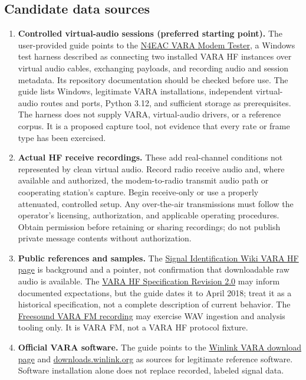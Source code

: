 \documentclass[11pt,a4paper]{article}
\begin{document}
\subsection{Candidate data sources}
\begin{enumerate}[leftmargin=*]
  \item \textbf{Controlled virtual-audio sessions (preferred starting point).}
        The user-provided guide points to the
        \href{https://github.com/N4EAC/VARA-Modem-Tester}{N4EAC VARA Modem
        Tester}, a Windows test harness described as connecting two installed
        VARA HF instances over virtual audio cables, exchanging payloads, and
        recording audio and session metadata. Its repository documentation
        should be checked before use. The guide lists Windows, legitimate
        VARA installations, independent virtual-audio routes and ports,
        Python 3.12, and sufficient storage as prerequisites. The harness does
        not supply VARA, virtual-audio drivers, or a reference corpus. It is a
        proposed capture tool, not evidence that every rate or frame type has
        been exercised.
  \item \textbf{Actual HF receive recordings.} These add real-channel
        conditions not represented by clean virtual audio. Record radio
        receive audio and, where available and authorized, the modem-to-radio
        transmit audio path or cooperating station's capture. Begin
        receive-only or use a properly attenuated, controlled setup. Any
        over-the-air transmissions must follow the operator's licensing,
        authorization, and applicable operating procedures. Obtain permission
        before retaining or sharing recordings; do not publish private message
        contents without authorization.
  \item \textbf{Public references and samples.} The
        \href{https://www.sigidwiki.com/wiki/VARA_HF}{Signal Identification
        Wiki VARA HF page} is background and a pointer, not confirmation that
        downloadable raw audio is available. The
        \href{https://sbcara.org/wp-content/uploads/2025/08/VARA-Specification.pdf}
        {VARA HF Specification Revision 2.0} may inform documented
        expectations, but the guide dates it to April 2018; treat it as a
        historical specification, not a complete description of current
        behavior. The
        \href{https://freesound.org/people/gregoryhancock/sounds/591324/}
        {Freesound VARA FM recording} may exercise WAV ingestion and analysis
        tooling only. It is VARA FM, not a VARA HF protocol fixture.
  \item \textbf{Official VARA software.} The guide points to the
        \href{https://winlink.org/content/vara_products_now_downloadable_here}
        {Winlink VARA download page} and
        \href{https://downloads.winlink.org}{downloads.winlink.org} as sources
        for legitimate reference software. Software installation alone does
        not replace recorded, labeled signal data.
\end{enumerate}
\end{document}
